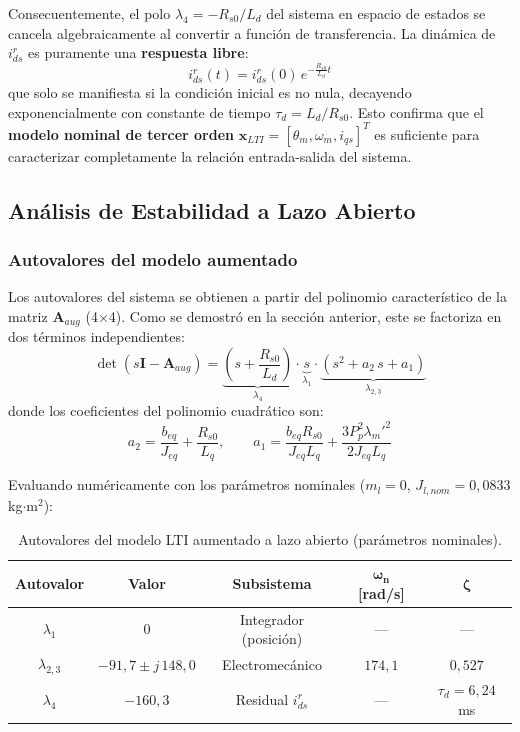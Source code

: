 \documentclass[12pt, a4paper,journal, onecolumn, compsoc]{IEEEtran}
\begin{document}
Consecuentemente, el polo $\lambda_4 = -R_{s0}/L_d$ del sistema en espacio de estados se cancela algebraicamente al convertir a función de transferencia. La dinámica de $i_{ds}^r$ es puramente una \textbf{respuesta libre}:
\begin{equation}
    i_{ds}^r(t) = i_{ds}^r(0) \, e^{-\frac{R_{s0}}{L_d} t}
\end{equation}
que solo se manifiesta si la condición inicial es no nula, decayendo exponencialmente con constante de tiempo $\tau_d = L_d / R_{s0}$. Esto confirma que el \textbf{modelo nominal de tercer orden} $\mathbf{x}_{LTI} = [\theta_m, \omega_m, i_{qs}]^T$ es suficiente para caracterizar completamente la relación entrada-salida del sistema.

\subsection{Análisis de Estabilidad a Lazo Abierto}

\subsubsection{Autovalores del modelo aumentado}
Los autovalores del sistema se obtienen a partir del polinomio característico de la matriz $\mathbf{A}_{aug}$ (4$\times$4). Como se demostró en la sección anterior, este se factoriza en dos términos independientes:
\begin{equation}
    \det(s\mathbf{I} - \mathbf{A}_{aug}) = \underbrace{\left(s + \frac{R_{s0}}{L_d}\right)}_{\lambda_4} \cdot \underbrace{s}_{\lambda_1} \cdot \underbrace{\left(s^2 + a_2\,s + a_1\right)}_{\lambda_{2,3}}
\end{equation}
donde los coeficientes del polinomio cuadrático son:
\begin{equation}
    a_2 = \frac{b_{eq}}{J_{eq}} + \frac{R_{s0}}{L_q}, \qquad a_1 = \frac{b_{eq} R_{s0}}{J_{eq} L_q} + \frac{3 P_p^2 \lambda_m'^2}{2 J_{eq} L_q}
\end{equation}

Evaluando numéricamente con los parámetros nominales ($m_l = 0$, $J_{l,nom} = 0{,}0833$ kg$\cdot$m$^2$):

\begin{table}[H]
\centering
\caption{Autovalores del modelo LTI aumentado a lazo abierto (parámetros nominales).}
\label{tab:autovalores_LA}
\renewcommand{\arraystretch}{1.4}
\begin{tabular}{|c|c|c|c|c|}
\hline
\textbf{Autovalor} & \textbf{Valor} & \textbf{Subsistema} & $\boldsymbol{\omega_n}$ \textbf{[rad/s]} & $\boldsymbol{\zeta}$ \\
\hline
$\lambda_1$ & $0$ & Integrador (posición) & --- & --- \\
\hline
$\lambda_{2,3}$ & $-91{,}7 \pm j\,148{,}0$ & Electromecánico & $174{,}1$ & $0{,}527$ \\
\hline
$\lambda_4$ & $-160{,}3$ & Residual $i_{ds}^r$ & --- & $\tau_d = 6{,}24$ ms \\
\hline
\end{tabular}
\end{table}
\end{document}
